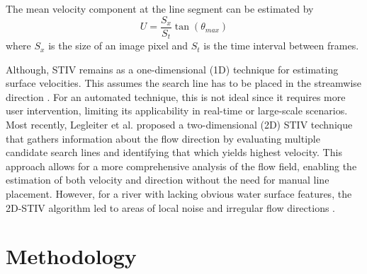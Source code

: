 \documentclass[12pt]{elsarticle}
\begin{document}
The mean velocity component at the line segment can be  estimated by
\begin{equation}
    U=\frac{S_x}{S_t}\tan(\theta_{max})
\end{equation}
where $S_x$ is the size of an image pixel and $S_t$ is the time interval between frames. 


Although, STIV remains as a one-dimensional (1D) technique for estimating surface velocities. This assumes the search line has to be placed in the streamwise direction \cite{fujita2019efficient, fujita2020application, fujita2007development,watanabe2021improving}. For an automated technique, this is not ideal since it requires more user intervention, limiting its applicability in real-time or large-scale scenarios. Most recently, Legleiter et al. \cite{legleiter2024two} proposed a two-dimensional (2D) STIV technique that gathers information about the flow direction by evaluating multiple candidate search lines and identifying that which yields highest velocity. This approach allows for a more comprehensive analysis of the flow field, enabling the estimation of both velocity and direction without the need for manual line placement. However, for a river with lacking obvious water surface features, the 2D-STIV algorithm led to areas of local noise and irregular flow directions \cite{legleiter2024two}.
\section{Methodology}
\end{document}
